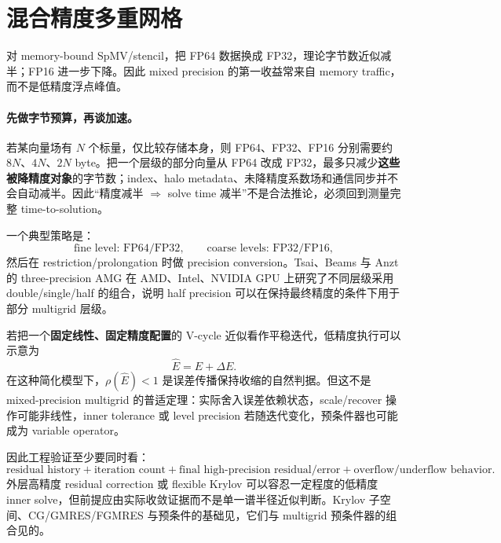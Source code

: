 \section{混合精度多重网格}

对 memory-bound SpMV/stencil，把 FP64 数据换成 FP32，理论字节数近似减半；FP16 进一步下降。因此 mixed precision 的第一收益常来自 memory traffic，而不是低精度浮点峰值。

\paragraph{先做字节预算，再谈加速。}
若某向量场有 $N$ 个标量，仅比较存储本身，则 FP64、FP32、FP16 分别需要约 $8N$、$4N$、$2N$ byte。把一个层级的部分向量从 FP64 改成 FP32，最多只减少\textbf{这些被降精度对象}的字节数；index、halo metadata、未降精度系数场和通信同步并不会自动减半。因此“精度减半 $\Rightarrow$ solve time 减半”不是合法推论，必须回到测量完整 time-to-solution。

一个典型策略是：
\begin{equation}
\text{fine level: FP64/FP32},\qquad
\text{coarse levels: FP32/FP16},
\end{equation}
然后在 restriction/prolongation 时做 precision conversion。Tsai、Beams 与 Anzt 的 three-precision AMG 在 AMD、Intel、NVIDIA GPU 上研究了不同层级采用 double/single/half 的组合，说明 half precision 可以在保持最终精度的条件下用于部分 multigrid 层级\cite{tsai2023three}。

若把一个\textbf{固定线性、固定精度配置}的 V-cycle 近似看作平稳迭代，低精度执行可以示意为
\begin{equation}
\widehat E=E+\Delta E.
\end{equation}
在这种简化模型下，$\rho(\widehat E)<1$ 是误差传播保持收缩的自然判据。但这不是 mixed-precision multigrid 的普适定理：实际舍入误差依赖状态，scale/recover 操作可能非线性，inner tolerance 或 level precision 若随迭代变化，预条件器也可能成为 variable operator。

因此工程验证至少要同时看：
\begin{equation}
\boxed{
\text{residual history}
+
\text{iteration count}
+
\text{final high-precision residual/error}
+
\text{overflow/underflow behavior}.
}
\label{eq:modern-mixed-precision-validation}
\end{equation}
外层高精度 residual correction 或 flexible Krylov 可以容忍一定程度的低精度 inner solve，但前提应由实际收敛证据而不是单一谱半径近似判断。Krylov 子空间、CG/GMRES/FGMRES 与预条件的基础见，它们与 multigrid 预条件器的组合见的。

